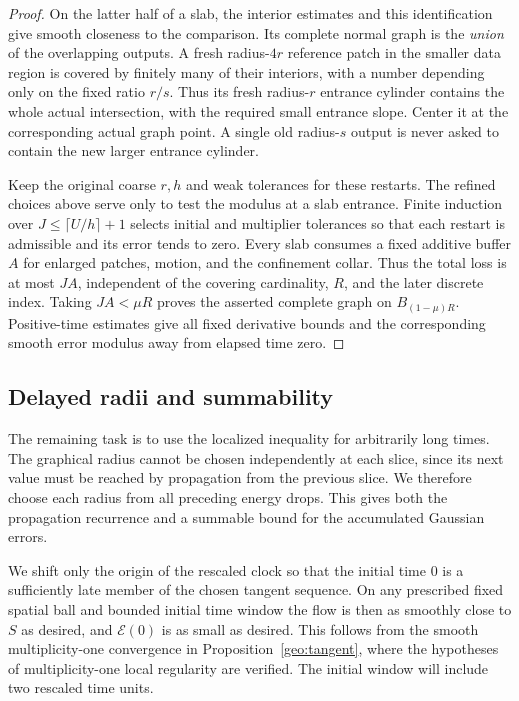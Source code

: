 \begin{proof}
On the latter half of a slab, the interior estimates and this
identification give smooth closeness to the comparison.  Its complete
normal graph is the \emph{union} of the overlapping outputs.
A fresh radius-$4r$ reference patch in the smaller data region is
covered by finitely many of their interiors, with a number depending
only on the fixed ratio $r/s$.  Thus its fresh radius-$r$ entrance
cylinder contains the whole actual intersection, with the required
small entrance slope.  Center it at the corresponding actual graph
point.  A single old radius-$s$ output is never asked to contain the
new larger entrance cylinder.

Keep the original coarse $r,h$ and weak tolerances for these
restarts.  The refined choices above serve only to test the modulus
at a slab entrance.  Finite induction over
$J\le\lceil U/h\rceil+1$ selects initial and multiplier tolerances
so that each restart is admissible and its error tends to zero.
Every slab consumes a fixed additive buffer $A$ for enlarged
patches, motion, and the confinement collar.  Thus the total loss is
at most $JA$, independent of the covering cardinality, $R$, and
the later discrete index.  Taking $JA<\mu R$ proves the asserted
complete graph on $B_{(1-\mu)R}$.  Positive-time estimates give all
fixed derivative bounds and the corresponding smooth error modulus
away from elapsed time zero.
\end{proof}

\subsection{Delayed radii and summability}

The remaining task is to use the localized inequality for arbitrarily
long times.  The graphical radius cannot be chosen independently at
each slice, since its next value must be reached by propagation from
the previous slice.  We therefore choose each radius from all preceding
energy drops.  This gives both the propagation recurrence and a
summable bound for the accumulated Gaussian errors.

We shift only the origin of the rescaled clock so that the initial
time $0$ is a sufficiently late member of the chosen tangent
sequence.  On any prescribed fixed spatial ball and bounded
initial time window the flow is then as smoothly close to $S$
as desired, and $\mathcal E(0)$ is as small as desired.  This follows from
the smooth multiplicity-one convergence in
Proposition~\ref{geo:tangent}, where the hypotheses of
multiplicity-one local regularity are verified.  The initial
window will include two rescaled time units.

